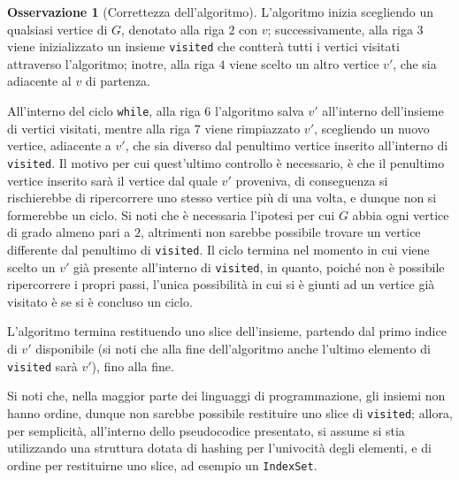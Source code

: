 \documentclass[14pt]{extreport}
\theoremstyle{definition}
\theoremstyle{definition}
\newtheorem{remark}{Osservazione}[subsection]
\begin{document}
\begin{remark}[Correttezza dell'algoritmo]
    L'algoritmo inizia scegliendo un qualsiasi vertice di $G$, denotato alla riga $2$ con $v$; successivamente, alla riga $3$ viene inizializzato un insieme \texttt{visited} che contterà tutti i vertici visitati attraverso l'algoritmo; inotre, alla riga $4$ viene scelto un altro vertice $v'$, che sia adiacente al $v$ di partenza.

    All'interno del ciclo \texttt{while}, alla riga $6$ l'algoritmo salva $v'$ all'interno dell'insieme di vertici visitati, mentre alla riga $7$ viene rimpiazzato $v'$, scegliendo un nuovo vertice, adiacente a $v'$, che sia diverso dal penultimo vertice inserito all'interno di \texttt{visited}. Il motivo per cui quest'ultimo controllo è necessario, è che il penultimo vertice inserito sarà il vertice dal quale $v'$ proveniva, di conseguenza si rischierebbe di ripercorrere uno stesso vertice più di una volta, e dunque non si formerebbe un ciclo. Si noti che è necessaria l'ipotesi per cui $G$ abbia ogni vertice di grado almeno pari a $2$, altrimenti non sarebbe possibile trovare un vertice differente dal penultimo di \texttt{visited}. Il ciclo termina nel momento in cui viene scelto un $v'$ già presente all'interno di \texttt{visited}, in quanto, poiché non è possibile ripercorrere i propri passi, l'unica possibilità in cui si è giunti ad un vertice già visitato è se si è concluso un ciclo.
    
    L'algoritmo termina restituendo uno slice dell'insieme, partendo dal primo indice di $v'$ disponibile (si noti che alla fine dell'algoritmo anche l'ultimo elemento di \texttt{visited} sarà $v'$), fino alla fine.

    Si noti che, nella maggior parte dei linguaggi di programmazione, gli insiemi non hanno ordine, dunque non sarebbe possibile restituire uno slice di \texttt{visited}; allora, per semplicità, all'interno dello pseudocodice presentato, si assume si stia utilizzando una struttura dotata di hashing per l'univocità degli elementi, e di ordine per restituirne uno slice, ad esempio un \texttt{IndexSet}.
\end{remark}
\end{document}
